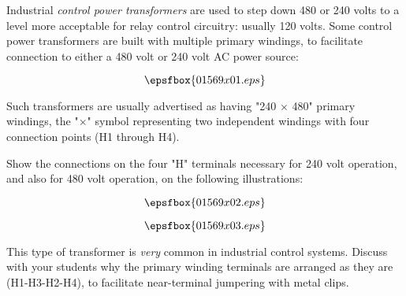

Industrial {\it control power transformers} are used to step down 480 or 240 volts to a level more acceptable for relay control circuitry: usually 120 volts.  Some control power transformers are built with multiple primary windings, to facilitate connection to either a 480 volt or 240 volt AC power source:

$$\epsfbox{01569x01.eps}$$

Such transformers are usually advertised as having "240 $\times$ 480" primary windings, the "$\times$" symbol representing two independent windings with four connection points (H1 through H4).

Show the connections on the four "H" terminals necessary for 240 volt operation, and also for 480 volt operation, on the following illustrations:

$$\epsfbox{01569x02.eps}$$







$$\epsfbox{01569x03.eps}$$







This type of transformer is {\it very} common in industrial control systems.  Discuss with your students why the primary winding terminals are arranged as they are (H1-H3-H2-H4), to facilitate near-terminal jumpering with metal clips.




